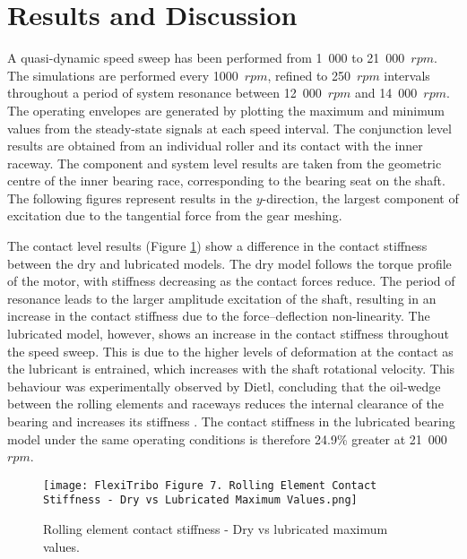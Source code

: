 \section{Results and Discussion}

A quasi-dynamic speed sweep has been performed from 1~000 to 21~000~$rpm$. The simulations are performed every 1000~$rpm$, refined to 250~$rpm$ intervals throughout a period of system resonance between 12~000~$rpm$ and 14~000~$rpm$. The operating envelopes are generated by plotting the maximum and minimum values from the steady-state signals at each speed interval. The conjunction level results are obtained from an individual roller and its contact with the inner raceway. The component and system level results are taken from the geometric centre of the inner bearing race, corresponding to the bearing seat on the shaft. The following figures represent results in the $y$-direction, the largest component of excitation due to the tangential force from the gear meshing.

The contact level results (Figure \ref{Rolling element contact stiffness - Dry vs lubricated maximum values}) show a difference in the contact stiffness between the dry and lubricated models. The dry model follows the torque profile of the motor, with stiffness decreasing as the contact forces reduce. The period of resonance leads to the larger amplitude excitation of the shaft, resulting in an increase in the contact stiffness due to the force–deflection non-linearity. The lubricated model, however, shows an increase in the contact stiffness throughout the speed sweep. This is due to the higher levels of deformation at the contact as the lubricant is entrained, which increases with the shaft rotational velocity. This behaviour was experimentally observed by Dietl, concluding that the oil-wedge between the rolling elements and raceways reduces the internal clearance of the bearing and increases its stiffness \cite{Dietl1997}. The contact stiffness in the lubricated bearing model under the same operating conditions is therefore 24.9\% greater at 21~000~$rpm$.

\begin{figure}
	\centering  
	\texttt{[image: FlexiTribo Figure 7. Rolling Element Contact Stiffness - Dry vs Lubricated Maximum Values.png]}
	\caption{Rolling element contact stiffness - Dry vs lubricated maximum values.}
	\label{Rolling element contact stiffness - Dry vs lubricated maximum values}
\end{figure} 

